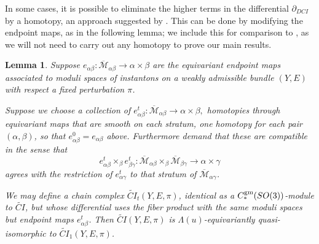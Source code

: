 \documentclass{memo-l}
\newtheorem{lemma}[theorem]{Lemma}
\theoremstyle{definition}
\theoremstyle{remark}
\numberwithin{section}{chapter}
\numberwithin{equation}{chapter}
\begin{document}
In some cases, it is possible to eliminate the higher terms in the differential $\partial_{DCI}$ by a homotopy, an approach suggested by \cite[Section~7.3.2]{Don}. This can be done by modifying the endpoint maps, as in the following lemma; we include this for comparison to \cite{Don}, as we will not need to carry out any homotopy to prove our main results.

\begin{lemma}\label{EndpointHomotopy}Suppose $e_{\alpha \beta}: \overline{\mathcal M}_{\alpha \beta} \to \alpha \times \beta$ are the equivariant endpoint maps associated to moduli spaces of instantons on a weakly admissible bundle $(Y,E)$ with respect a fixed perturbation $\pi$.

Suppose we choose a collection of $e^t_{\alpha \beta}: \overline{\mathcal M}_{\alpha \beta} \to \alpha \times \beta,$ homotopies through equivariant maps that are smooth on each stratum, one homotopy for each pair $(\alpha,\beta)$, so that $e^0_{\alpha \beta} = e_{\alpha \beta}$ above. Furthermore demand that these are compatible in the sense that $$e^t_{\alpha \beta} \times_\beta e^t_{\beta \gamma}: \overline{\mathcal M}_{\alpha \beta} \times_\beta \overline{\mathcal M}_{\beta \gamma} \to \alpha \times \gamma$$ agrees with the restriction of $e^t_{\alpha \gamma}$ to that stratum of $\overline{\mathcal M}_{\alpha \gamma}$.

We may define a chain complex $\widetilde{CI}_t(Y,E,\pi)$, identical as a $C_*^{\textup{gm}}(SO(3))$-module to $\widetilde{CI}$, but whose differential uses the fiber product with the same moduli spaces but endpoint maps $e^t_{\alpha \beta}$. Then $\widetilde{CI}(Y,E,\pi)$ is $\Lambda(u)$-equivariantly quasi-isomorphic to $\widetilde{CI}_1(Y,E,\pi)$.
\end{lemma}
\end{document}
